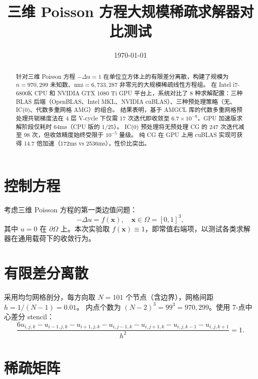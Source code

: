 \documentclass[12pt,a4paper]{ctexart}
\title{\textbf{三维 Poisson 方程大规模稀疏求解器对比测试}}
\author{}
\date{\today}
\begin{document}
\maketitle

\begin{abstract}
针对三维 Poisson 方程 $-\Delta u = 1$ 在单位立方体上的有限差分离散，构建了规模为 $n=970{,}299$ 未知数、$\mathrm{nnz}=6{,}733{,}287$ 非零元的大规模稀疏线性方程组。
在 Intel i7-6800K CPU 和 NVIDIA GTX 1080 Ti GPU 平台上，系统对比了 8 种求解配置：三种 BLAS 后端（OpenBLAS、Intel MKL、NVIDIA cuBLAS）、三种预处理策略（无、IC(0)、代数多重网格 AMG）的组合。
结果表明，基于 AMGCL 库的代数多重网格预处理共轭梯度法在 4 层 V-cycle 下仅需 17 次迭代即收敛至 $6.7\times10^{-9}$，GPU 加速版求解阶段仅耗时 64ms（CPU 版的 1/25）。
IC(0) 预处理将无预处理 CG 的 247 次迭代减至 98 次，但收敛精度始终受限于 $10^{-5}$ 量级。
纯 CG 在 GPU 上用 cuBLAS 实现可获得 14.7 倍加速（172ms vs 2536ms），性价比突出。
\end{abstract}

\section{控制方程}

考虑三维 Poisson 方程的第一类边值问题：
\begin{equation}\label{eq:poisson}
-\Delta u = f(\mathbf{x}), \quad \mathbf{x} \in \Omega = [0,1]^3,
\end{equation}
其中 $u = 0$ 在 $\partial\Omega$ 上。本次实验取 $f(\mathbf{x}) \equiv 1$，即常值右端项，以测试各类求解器在通用载荷下的收敛行为。

\section{有限差分离散}

采用均匀网格剖分，每方向取 $N=101$ 个节点（含边界），网格间距 $h = 1/(N-1) = 0.01$。
内点个数为 $(N-2)^3 = 99^3 = 970{,}299$。使用 7-点中心差分 stencil：
\begin{equation}\label{eq:stencil}
\frac{6u_{i,j,k} - u_{i-1,j,k} - u_{i+1,j,k} - u_{i,j-1,k} - u_{i,j+1,k} - u_{i,j,k-1} - u_{i,j,k+1}}{h^2} = 1.
\end{equation}

\section{稀疏矩阵}
\end{document}

